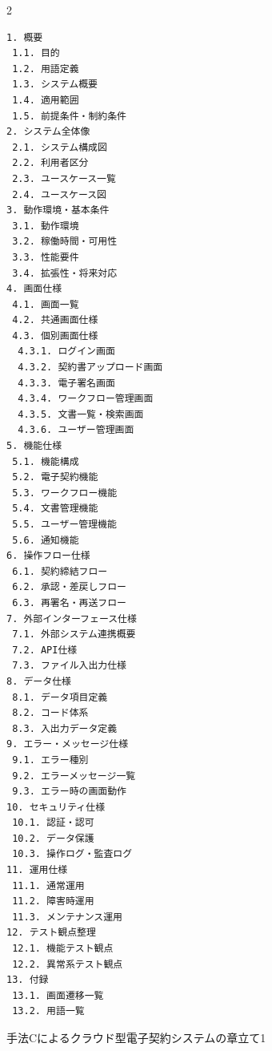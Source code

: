 \begin{figure}[htbp]
\begin{tcolorbox}[
  colback=white,
  colframe=black,
  fonttitle=\bfseries
]
\begin{multicols}{2}
\footnotesize
\ttfamily
\fontsize{11}{12}\selectfont
\begin{verbatim}
1. 概要
 1.1. 目的
 1.2. 用語定義
 1.3. システム概要
 1.4. 適用範囲
 1.5. 前提条件・制約条件
2. システム全体像
 2.1. システム構成図
 2.2. 利用者区分
 2.3. ユースケース一覧
 2.4. ユースケース図
3. 動作環境・基本条件
 3.1. 動作環境
 3.2. 稼働時間・可用性
 3.3. 性能要件
 3.4. 拡張性・将来対応
4. 画面仕様
 4.1. 画面一覧
 4.2. 共通画面仕様
 4.3. 個別画面仕様
  4.3.1. ログイン画面
  4.3.2. 契約書アップロード画面
  4.3.3. 電子署名画面
  4.3.4. ワークフロー管理画面
  4.3.5. 文書一覧・検索画面
  4.3.6. ユーザー管理画面
5. 機能仕様
 5.1. 機能構成
 5.2. 電子契約機能
 5.3. ワークフロー機能
 5.4. 文書管理機能
 5.5. ユーザー管理機能
 5.6. 通知機能
6. 操作フロー仕様
 6.1. 契約締結フロー
 6.2. 承認・差戻しフロー
 6.3. 再署名・再送フロー
7. 外部インターフェース仕様
 7.1. 外部システム連携概要
 7.2. API仕様
 7.3. ファイル入出力仕様
8. データ仕様
 8.1. データ項目定義
 8.2. コード体系
 8.3. 入出力データ定義
9. エラー・メッセージ仕様
 9.1. エラー種別
 9.2. エラーメッセージ一覧
 9.3. エラー時の画面動作
10. セキュリティ仕様
 10.1. 認証・認可
 10.2. データ保護
 10.3. 操作ログ・監査ログ
11. 運用仕様
 11.1. 通常運用
 11.2. 障害時運用
 11.3. メンテナンス運用
12. テスト観点整理
 12.1. 機能テスト観点
 12.2. 異常系テスト観点
13. 付録
 13.1. 画面遷移一覧
 13.2. 用語一覧
\end{verbatim}
\end{multicols}
\end{tcolorbox}
\caption{手法Cによるクラウド型電子契約システムの章立て1}
\label{fig:C_chapter_structure_of_cloud_contract_system_1}
\end{figure}


